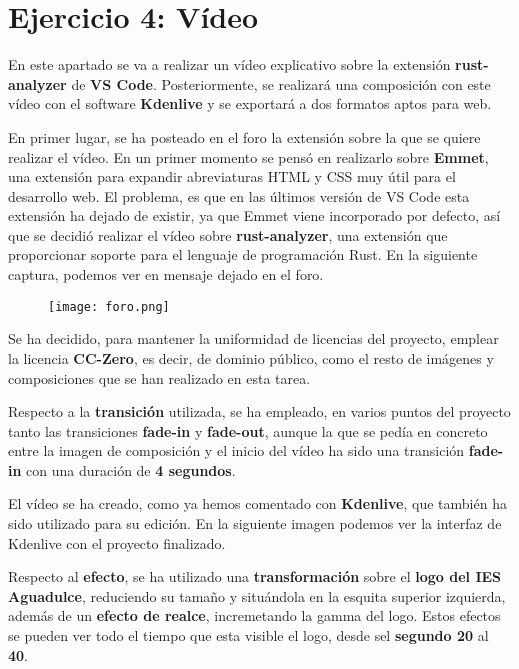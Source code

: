 \section{Ejercicio 4: Vídeo}
En este apartado se va a realizar un vídeo explicativo sobre la extensión \textbf{rust-analyzer} de \textbf{VS Code}. Posteriormente, se realizará una composición con este vídeo con el software \textbf{Kdenlive} y se exportará a dos formatos aptos para web.

En primer lugar, se ha posteado en el foro la extensión sobre la que se quiere realizar el vídeo. En un primer momento se pensó en realizarlo sobre \textbf{Emmet}, una extensión para expandir abreviaturas HTML y CSS muy útil para el desarrollo web. El problema, es que en las últimos versión de VS Code esta extensión ha dejado de existir, ya que Emmet viene incorporado por defecto, así que se decidió realizar el vídeo sobre \textbf{rust-analyzer}, una extensión que proporcionar soporte para el lenguaje de programación Rust. En la siguiente captura, podemos ver en mensaje dejado en el foro.

\begin{figure}[H]
    \centering
    \texttt{[image: foro.png]}
\end{figure}

Se ha decidido, para mantener la uniformidad de licencias del proyecto, emplear la licencia \textbf{CC-Zero}, es decir, de dominio público, como el resto de imágenes y composiciones que se han realizado en esta tarea.

Respecto a la \textbf{transición} utilizada, se ha empleado, en varios puntos del proyecto tanto las transiciones \textbf{fade-in} y \textbf{fade-out}, aunque la que se pedía en concreto entre la imagen de composición y el inicio del vídeo ha sido una transición \textbf{fade-in} con una duración de \textbf{4 segundos}.

El vídeo se ha creado, como ya hemos comentado con \textbf{Kdenlive}, que también ha sido utilizado para su edición. En la siguiente imagen podemos ver la interfaz de Kdenlive con el proyecto finalizado.

Respecto al \textbf{efecto}, se ha utilizado una \textbf{transformación} sobre el \textbf{logo del IES Aguadulce}, reduciendo su tamaño y situándola en la esquita superior izquierda, además de un \textbf{efecto de realce}, incremetando la gamma del logo. Estos efectos se pueden ver todo el tiempo que esta visible el logo, desde sel \textbf{segundo 20} al \textbf{40}.

